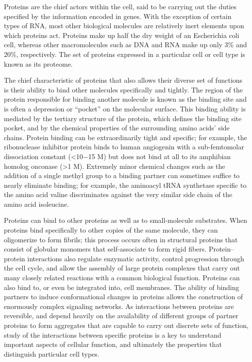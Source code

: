 Proteins are the chief actors within the cell, said to be carrying out the duties specified by the information encoded in genes. With the exception of certain types of RNA, most other biological molecules are relatively inert elements upon which proteins act. Proteins make up half the dry weight of an Escherichia coli cell, whereas other macromolecules such as DNA and RNA make up only 3\% and 20\%, respectively. The set of proteins expressed in a particular cell or cell type is known as its proteome.

The chief characteristic of proteins that also allows their diverse set of functions is their ability to bind other molecules specifically and tightly. The region of the protein responsible for binding another molecule is known as the binding site and is often a depression or ``pocket'' on the molecular surface. This binding ability is mediated by the tertiary structure of the protein, which defines the binding site pocket, and by the chemical properties of the surrounding amino acids' side chains. Protein binding can be extraordinarily tight and specific; for example, the ribonuclease inhibitor protein binds to human angiogenin with a sub-femtomolar dissociation constant (\textless10−15 M) but does not bind at all to its amphibian homolog onconase (\textgreater1 M). Extremely minor chemical changes such as the addition of a single methyl group to a binding partner can sometimes suffice to nearly eliminate binding; for example, the aminoacyl tRNA synthetase specific to the amino acid valine discriminates against the very similar side chain of the amino acid isoleucine.

Proteins can bind to other proteins as well as to small-molecule substrates. When proteins bind specifically to other copies of the same molecule, they can oligomerize to form fibrils; this process occurs often in structural proteins that consist of globular monomers that self-associate to form rigid fibers. Protein--protein interactions also regulate enzymatic activity, control progression through the cell cycle, and allow the assembly of large protein complexes that carry out many closely related reactions with a common biological function. Proteins can also bind to, or even be integrated into, cell membranes. The ability of binding partners to induce conformational changes in proteins allows the construction of enormously complex signaling networks. As interactions between proteins are reversible, and depend heavily on the availability of different groups of partner proteins to form aggregates that are capable to carry out discrete sets of function, study of the interactions between specific proteins is a key to understand important aspects of cellular function, and ultimately the properties that distinguish particular cell types.


